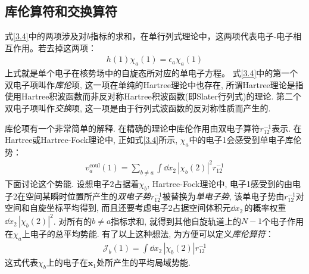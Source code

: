 \subsection{库伦算符和交换算符}
式\eqref{3.4}中的两项涉及对$b$指标的求和，在单行列式理论中，这两项代表电子-电子相互作用。若去掉这两项：
\begin{align}
h(1)\chi_a(1) = \epsilon_a\chi_a(1)
\end{align}
上式就是单个电子在核势场中的自旋态所对应的单电子\sch 方程。 式\eqref{3.4}中的第一个双电子项叫作\emph{库伦}项, 这一项在单纯的Hartree理论中也存在, 所谓Hartree理论是指使用Hartree积波函数而非反对称Hartree积波函数(即Slater行列式)的理论. 第二个双电子项叫作\emph{交换}项, 这一项是由于行列式波函数的反对称性质而产生的.

库伦项有一个非常简单的解释. 在精确的理论中库伦作用由双电子算符$r_{12}^{-1}$表示. 在Hartree或Hartree-Fock理论中, 正如式\eqref{3.4}所示, $\chi_a$中的电子1会感受到单电子库伦势：
\begin{align}
v_a^\mathrm{coul}(1) = \sum_{b\neq a} \int\dd{x}_2\,|\chi_b(2)|^2 r_{12}^{-1}
\end{align}
下面讨论这个势能. 设想电子$2$占据着$\chi_b$, Hartree-Fock理论中, 电子1感受到的由电子2在空间某瞬时位置所产生的\emph{双电子势$r_{12}^{-1}$}被替换为\emph{单电子势}, 该单电子势由$r_{12}^{-1}$对空间和自旋坐标平均得到, 而且还要考虑电子2占据空间体积元$\dd{x}_2\,$的概率权重$\dd{x}_2\,|\chi_b(2)|^2$. 对所有的$b\neq a$指标求和, 就得到其他自旋轨道上的$N-1$个电子作用在$\chi_a$上电子的总平均势能. 有了以上这种想法, 为方便可以定义\emph{库伦算符}：
\begin{align}
\mathscr{J}_b(1) = \int\dd{x}_2\,|\chi_b(2)|r_{12}^{-1}
\end{align}
这式代表$\chi_b$上的电子在$\mathbf{x}_1$处所产生的平均局域势能.

